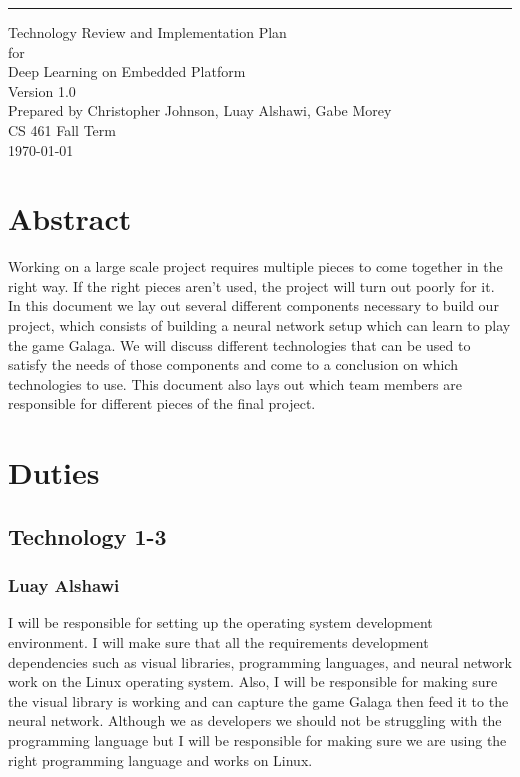 \documentclass{scrreprt}
\date{}
\def\myversion{1.0}
\begin{document}
\begin{flushright}
    \rule{16cm}{5pt}\vskip1cm
    \begin{bfseries}
        \Huge{Technology Review and Implementation Plan}\\
        \vspace{1.9cm}
        for\\
        \vspace{1.9cm}
        Deep Learning on Embedded Platform\\
        \vspace{1.9cm}
        \LARGE{Version \myversion}\\
        \vspace{1.9cm}
        Prepared by Christopher Johnson, Luay Alshawi, Gabe Morey\\
        \vspace{1.9cm}
        CS 461 Fall Term\\
        \vspace{1.9cm}
        \today\\
    \end{bfseries}
\end{flushright}


\chapter{Abstract}
Working on a large scale project requires multiple pieces to come together in the right way. If the right pieces aren’t used,
the project will turn out poorly for it. In this document we lay out several different components necessary to build our project,
which consists of building a neural network setup which can learn to play the game Galaga.
We will discuss different technologies that can be used to satisfy the needs of those components and come to a conclusion on which technologies to use.
 This document also lays out which team members are responsible for different pieces of the final project.

\chapter{Duties}
\section{Technology 1-3}

\subsection{Luay Alshawi}
I will be responsible for setting up the operating system development environment.
I will make sure that all the requirements development dependencies such as visual libraries, programming languages, and neural network work on the Linux operating system.
Also, I will be responsible for making sure the visual library is working and can capture the game Galaga then feed it to the neural network.
Although we as developers we should not be struggling with the programming language but I will be responsible for making sure we are using the right programming language and works on Linux.
\end{document}
